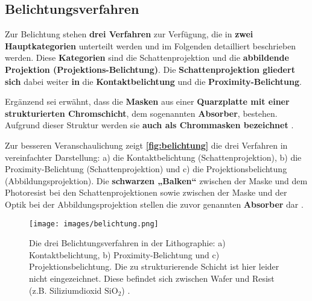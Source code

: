 \documentclass{article} %
\begin{document}


\vspace{1em}

\subsection{Belichtungsverfahren}

Zur Belichtung stehen \textbf{drei Verfahren} zur Verfügung, die in \textbf{zwei Hauptkategorien} unterteilt werden und im Folgenden detailliert beschrieben werden. Diese \textbf{Kategorien} sind die Schattenprojektion und die \textbf{abbildende Projektion (Projektions-Belichtung)}. Die \textbf{Schattenprojektion gliedert sich} dabei weiter \textbf{in} die \textbf{Kontaktbelichtung} und die \textbf{Proximity-Belichtung}.

\vspace{1em}

Ergänzend sei erwähnt, dass die \textbf{Masken} aus einer \textbf{Quarzplatte mit einer strukturierten Chromschicht}, dem sogenannten \textbf{Absorber}, bestehen. Aufgrund dieser Struktur werden sie \textbf{auch als Chrommasken bezeichnet} \cite{schmid2024, Mescheder2004}.

\vspace{1em}

Zur besseren Veranschaulichung zeigt \textbf{\autoref{fig:belichtung}} die drei Verfahren in vereinfachter Darstellung: a) die Kontaktbelichtung (Schattenprojektion), b) die Proximity-Belichtung (Schattenprojektion) und c) die Projektionsbelichtung (Abbildungsprojektion). Die \textbf{schwarzen „Balken“} zwischen der Maske und dem Photoresist bei den Schattenprojektionen sowie zwischen der Maske und der Optik bei der Abbildungsprojektion stellen die zuvor genannten \textbf{Absorber} dar \cite{schmid2024}.

\begin{figure}[htb!]
    \centering
    \texttt{[image: images/belichtung.png]} %
    \captionsetup{labelfont=bf, width=\textwidth} %
    \caption{Die drei Belichtungsverfahren in der Lithographie: a) Kontaktbelichtung, b) Proximity-Belichtung und c) Projektionsbelichtung. Die zu strukturierende Schicht ist hier leider nicht eingezeichnet. Diese befindet sich zwischen Wafer und Resist (z.B. Siliziumdioxid $\mathrm{SiO}_2$) \cite{cowburn1997}.}
    \label{fig:belichtung}
\end{figure}
\end{document}
